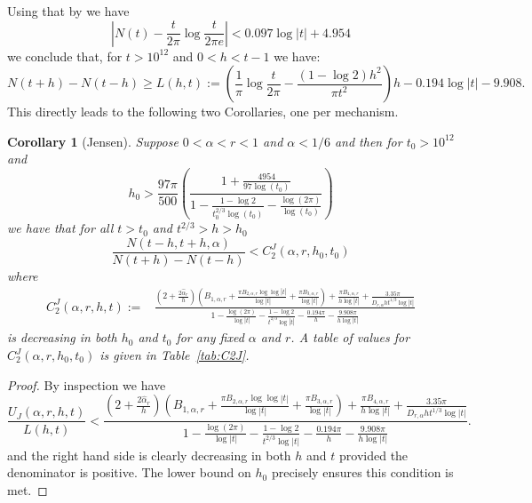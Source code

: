 \documentclass[10pt,english,letter, reqno]{amsart}
\theoremstyle{plain}
\newtheorem{corollary}[theorem]{Corollary}
\theoremstyle{definition}
\begin{document}
Using that by \cite[Corollary~1.3]{BellottiWong2026} we have
\[ \left|N(t) - \frac{t}{2\pi}\log\frac t{2\pi e}\right| <  0.097\log|t|+4.954 \]
we conclude that, for $t>10^{12}$ and $0<h<t-1$ we have:
\[ N(t+h) - N(t-h) \geq L(h,t) := \left(\frac{1}{\pi}\log\frac{t}{2\pi}-\frac{(1-\log 2)h^2}{\pi t^2} \right)h - 0.194\log|t| - 9.908. \]
This directly leads to the following two Corollaries, one per mechanism.
\begin{corollary}[Jensen]\label{cor:main-jensen}
Suppose $0<\alpha<r<1$ and $\alpha<1/6$ and then for $t_0>10^{12}$ and
\[ h_0>\frac{97\pi}{500}\left(\frac{1 + \frac{4954}{97\log(t_0)}}{1 -\frac{1-\log 2}{t_0^{2/3}\log(t_0)}-\frac{\log(2\pi)}{\log(t_0)}}\right) \]
 we have that for all $t>t_0$ and $t^{2/3}>h>h_0$
\[\frac{ N(t-h,t+h,\alpha)}{N(t+h)-N(t-h)}  < C_2^J(\alpha,r,h_0,t_0) \]
where
\begin{align*}  C_2^J(\alpha,r,h,t)   :=& \frac{(2+\frac{2\hat{\alpha}_r}{h})\!\left(B_{1,\alpha,r} + \frac{\pi B_{2,\alpha,r}\log\log|t|}{\log|t|} + \frac{\pi B_{3,\alpha,r}}{\log|t|}\right) + \frac{\pi B_{4,\alpha,r}}{h\log|t|} + \frac{3.35\pi}{D_{r,\alpha}h t^{1/3}\log|t|} }
{1 - \frac{\log(2\pi)}{\log|t|} -  \frac{1-\log 2}{t^{2/3} \log|t|} - \frac{0.194\pi}{h} - \frac{9.908\pi}{h\log|t|}}
\end{align*}
is decreasing in both $h_0$ and $t_0$ for any fixed $\alpha$ and $r$.
A table of values for $C_2^J(\alpha,r,h_0,t_0)   $ is given in Table~\ref{tab:C2J}.
\end{corollary}
\begin{proof}
By inspection we have
\[ \frac{U_J(\alpha,r,h,t)}{L(h,t)} < \frac{(2+\frac{2\hat{\alpha}_r}{h})\!\left(B_{1,\alpha,r} + \frac{\pi B_{2,\alpha,r}\log\log|t|}{\log|t|} + \frac{\pi B_{3,\alpha,r}}{\log|t|}\right) + \frac{\pi B_{4,\alpha,r}}{h\log|t|} + \frac{3.35\pi}{D_{r,\alpha}ht^{1/3}\log|t|} }
{1 - \frac{\log(2\pi)}{\log|t|} -  \frac{1-\log 2}{t^{2/3} \log|t|} - \frac{0.194\pi}{h} - \frac{9.908\pi}{h\log|t|}}. \]
and the right hand side is clearly decreasing in both $h$ and $t$ provided the denominator is positive.
The lower bound on $h_0$ precisely ensures this condition is met.
\end{proof}
\end{document}
